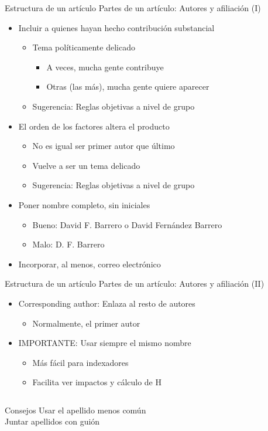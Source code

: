 \documentclass{beamer}
\begin{document}
\begin{frame}{Estructura de un artículo} {Partes de un artículo: Autores y afiliación (I)}
	\begin{itemize}
		\item Incluir a quienes hayan hecho contribución substancial
			\begin{itemize}
			\item Tema políticamente delicado
			\begin{itemize}
			\item A veces, mucha gente contribuye
			\item Otras (las más), mucha gente quiere aparecer
			\end{itemize}
			\item Sugerencia: Reglas objetivas a nivel de grupo
			\end{itemize}
		\item El orden de los factores altera el producto
			\begin{itemize}
			\item No es igual ser primer autor que último
			\item Vuelve a ser un tema delicado
			\item Sugerencia: Reglas objetivas a nivel de grupo
			\end{itemize}
		\item Poner nombre completo, sin iniciales
			\begin{itemize}
			\item Bueno: David F. Barrero o David Fernández Barrero
			\item Malo: D. F. Barrero
			\end{itemize}
		\item Incorporar, al menos, correo electrónico
	\end{itemize}
\end{frame}

\begin{frame}{Estructura de un artículo} {Partes de un artículo: Autores y afiliación (II)}
	\begin{itemize}
		\item \alert{Corresponding author}: Enlaza al resto de autores
			\begin{itemize}
			\item Normalmente, el primer autor
			\end{itemize}
		\item IMPORTANTE: Usar siempre el mismo nombre
			\begin{itemize}
			\item Más fácil para indexadores
			\item Facilita ver impactos y cálculo de H
			\end{itemize}
	\end{itemize}
	\begin{columns}
	\begin{block}{Consejos}
		\centering Usar el apellido menos común\\
		\centering Juntar apellidos con guión
	\end{block}
	\end{columns}
\end{frame}
\end{document}
